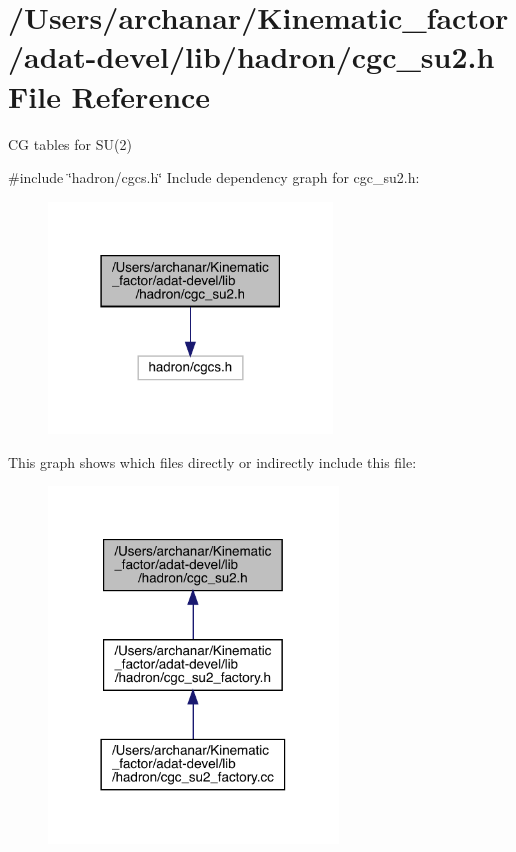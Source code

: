 \hypertarget{adat-devel_2lib_2hadron_2cgc__su2_8h}{}\section{/\+Users/archanar/\+Kinematic\+\_\+factor/adat-\/devel/lib/hadron/cgc\+\_\+su2.h File Reference}
\label{adat-devel_2lib_2hadron_2cgc__su2_8h}


CG tables for S\+U(2)  


{\ttfamily \#include \char`\"{}hadron/cgcs.\+h\char`\"{}}\newline
Include dependency graph for cgc\+\_\+su2.\+h\+:
\nopagebreak
\begin{figure}[H]
\begin{center}
\leavevmode
\includegraphics[width=214pt]{d0/db1/adat-devel_2lib_2hadron_2cgc__su2_8h__incl}
\end{center}
\end{figure}
This graph shows which files directly or indirectly include this file\+:
\nopagebreak
\begin{figure}[H]
\begin{center}
\leavevmode
\includegraphics[width=218pt]{de/d9b/adat-devel_2lib_2hadron_2cgc__su2_8h__dep__incl}
\end{center}
\end{figure}
